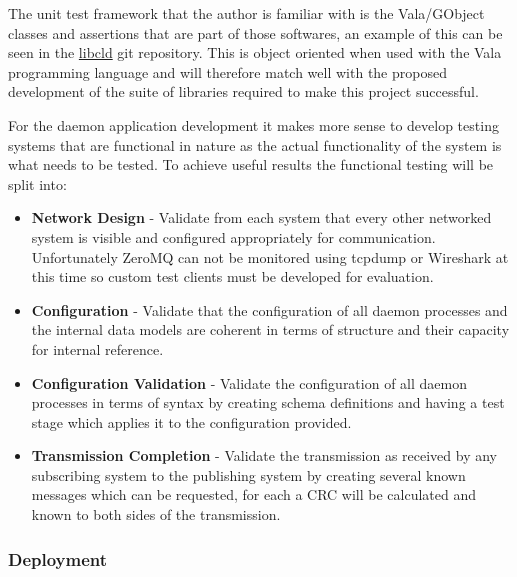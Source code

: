 \documentclass[11pt]{article}
\begin{document}
        The unit test framework that the author is familiar with is the
        Vala/GObject classes and assertions that are part of those softwares,
        an example of this can be seen in the
        \href{https://github.com/geoffjay/libcld/tree/master/tests}{libcld} git
        repository. This is object oriented when used with the Vala programming
        language and will therefore match well with the proposed development of
        the suite of libraries required to make this project successful.

        For the daemon application development it makes more sense to develop
        testing systems that are functional in nature as the actual functionality
        of the system is what needs to be tested. To achieve useful results the
        functional testing will be split into:

        \begin{itemize}
          \item \textbf{Network Design} - Validate from each system that every
                other networked system is visible and configured appropriately
                for communication. Unfortunately ZeroMQ can not be monitored
                using tcpdump or Wireshark at this time so custom test clients
                must be developed for evaluation.
          \item \textbf{Configuration} - Validate that the configuration of
                all daemon processes and the internal data models are coherent
                in terms of structure and their capacity for internal
                reference.
          \item \textbf{Configuration Validation} - Validate the configuration
                of all daemon processes in terms of syntax by creating schema
                definitions and having a test stage which applies it to the
                configuration provided.
          \item \textbf{Transmission Completion} - Validate the transmission
                as received by any subscribing system to the publishing system
                by creating several known messages which can be requested, for
                each a CRC will be calculated and known to both sides of the
                transmission.
        \end{itemize}

      \subsubsection{Deployment}\label{sec:soln-model-deploy}
\end{document}
